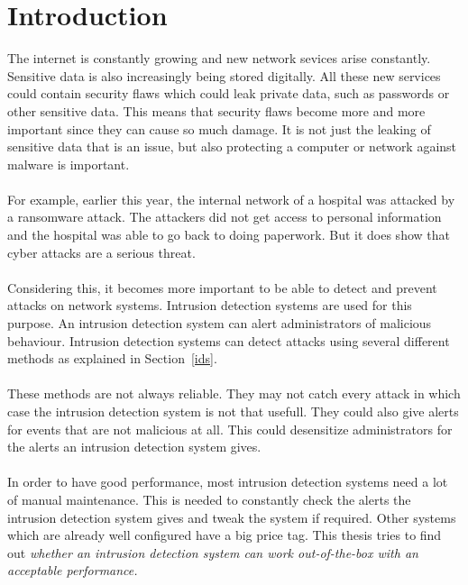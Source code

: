 
\chapter{Introduction} %

\label{Chapter1} %

The internet is constantly growing and new network sevices arise constantly. Sensitive data is also increasingly being stored digitally. All these new services could contain security flaws which could leak private data, such as passwords or other sensitive data. This means that security flaws become more and more important since they can cause so much damage. It is not just the leaking of sensitive data that is an issue, but also protecting a computer or network against malware is important. \\
\\
For example, earlier this year, the internal network of a hospital was attacked by a ransomware attack. The attackers did not get access to personal information and the hospital was able to go back to doing paperwork. But it does show that cyber attacks are a serious threat. \cite{ransomware}\\
\\
Considering this, it becomes more important to be able to detect and prevent attacks on network systems. Intrusion detection systems are used for this purpose. An intrusion detection system can alert administrators of malicious behaviour. Intrusion detection systems can detect attacks using several different methods as explained in Section~\ref{ids}. \\
\\
These methods are not always reliable. They may not catch every attack in which case the intrusion detection system is not that usefull. They could also give alerts for events that are not malicious at all. This could desensitize administrators for the alerts an intrusion detection system gives. \\
\\
In order to have good performance, most intrusion detection systems need a lot of manual maintenance. This is needed to constantly check the alerts the intrusion detection system gives and tweak the system if required. Other systems which are already well configured have a big price tag. This thesis tries to find out \textit{whether an intrusion detection system can work out-of-the-box with an acceptable performance.} \\
